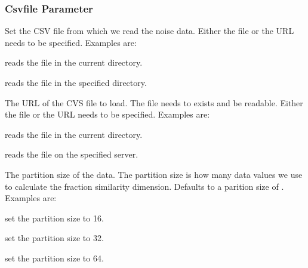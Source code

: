 \label{sec:csvfile_project_parameter}
\subsubsection{Csvfile Parameter}

\label{par:csvfile_file}

Set the CSV file from which we read the noise data.
Either the file or the URL needs to be specified.
Examples are:
\begin{compactitem}
\item {} reads the  file in the
current directory.
\item {} reads
the  file in the specified directory.
\end{compactitem}

\label{par:csvfile_url}

The URL of the CVS file to load. The file needs to exists and be readable.
Either the file or the URL needs to be specified.
Examples are:
\begin{compactitem}
\item {} reads the  file in the
current directory.
\item {} reads
the  file on the specified server.
\end{compactitem}

\label{par:csvfile_partition_size}

The partition size of the data. The partition size is how many
data values we use to calculate the fraction similarity dimension.
Defaults to a parition size of .
Examples are:
\begin{compactitem}
\item {} set the partition size to 16.
\item {} set the partition size to 32.
\item {} set the partition size to 64.
\end{compactitem}

\label{par:csvfile_derivations_count}

